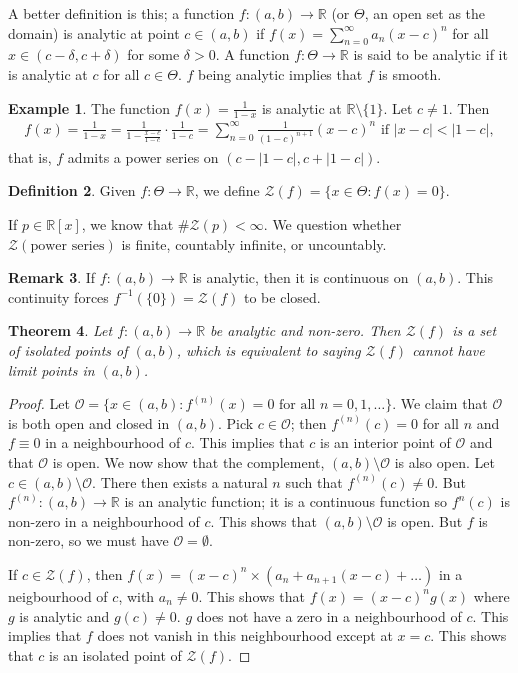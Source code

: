 \documentclass[15pt,a4paper]{book}
\newtheorem{theorem}{Theorem}[chapter]
\theoremstyle{definition}
\newtheorem{definition}[theorem]{Definition}
\newtheorem{example}[theorem]{Example}
\newtheorem{remark}[theorem]{Remark}
\newcommand{\abs}[1]{\left| #1 \right|} %
\newcommand{\R}{\mathbb{R}} %
\newcommand{\cZ}{\mathcal{Z}}
\newcommand{\cO}{\mathcal{O}}
\begin{document}
A better definition is this; a function $f:(a,b) \to \R$ (or $\Theta$, an open set as the domain) is analytic at point $c \in (a,b)$ if $f(x) = \sum_{n=0}^{\infty} a_{n}(x-c)^{n}$ for all $x \in (c-\delta,c+\delta)$ for some $\delta > 0$. A function $f:\Theta \to \R$ is said to be analytic if it is analytic at $c$ for all $c \in \Theta$. $f$ being analytic implies that $f$ is smooth.

\begin{example}
    The function $f(x) = \frac{1}{1-x}$ is analytic at $\R \setminus \{1\}$. Let $c \neq 1$. Then
    \begin{align}
        f(x) = \frac{1}{1-x} = \frac{1}{1-\frac{x-c}{1-c}} \cdot \frac{1}{1-c} = \sum_{n=0}^{\infty} \frac{1}{(1-c)^{n+1}}(x-c)^{n} \text{ if } \abs{x-c} < \abs{1-c},
    \end{align}
    that is, $f$ admits a power series on $(c-\abs{1-c},c+\abs{1-c})$.
\end{example}

\begin{definition}
    Given $f:\Theta \to \R$, we define $\cZ(f) = \{x \in \Theta : f(x) = 0\}$.
\end{definition}
If $p \in \R[x]$, we know that $\# \cZ(p) < \infty$. We question whether $\cZ(\text{power series})$ is finite, countably infinite, or uncountably.
\begin{remark}
    If $f:(a,b) \to \R$ is analytic, then it is continuous on $(a,b)$. This continuity forces $f^{-1}(\{0\}) = \cZ(f)$ to be closed.
\end{remark}

\begin{theorem}
    Let $f:(a,b) \to \R$ be analytic and non-zero. Then $\cZ(f)$ is a set of isolated points of $(a,b)$, which is equivalent to saying $\cZ(f)$ cannot have limit points in $(a,b)$.
\end{theorem}
\begin{proof}
    Let $\cO = \{x \in (a,b) : f^{(n)}(x) = 0 \text{ for all } n = 0,1,\ldots\}$. We claim that $\cO$ is both open and closed in $(a,b)$. Pick $c \in \cO$; then $f^{(n)}(c) = 0$ for all $n$ and $f \equiv 0$ in a neighbourhood of $c$. This implies that $c$ is an interior point of $\cO$ and that $\cO$ is open. We now show that the complement, $(a,b)\setminus\cO$ is also open. Let $c \in (a,b)\setminus\cO$. There then exists a natural $n$ such that $f^{(n)}(c) \neq 0$. But $f^{(n)}:(a,b) \to \R$ is an analytic function; it is a continuous function so $f^{n}(c)$ is non-zero in a neighbourhood of $c$. This shows that $(a,b)\setminus \cO$ is open. But $f$ is non-zero, so we must have $\cO = \emptyset$.
    
    If $c \in \cZ(f)$, then $f(x) = (x-c)^{n} \times (a_{n}+a_{n+1}(x-c) + \ldots)$ in a neigbourhood of $c$, with $a_{n} \neq 0$. This shows that $f(x) = (x-c)^{n}g(x)$ where $g$ is analytic and $g(c) \neq 0$. $g$ does not have a zero in a neighbourhood of $c$. This implies that $f$ does not vanish in this neighbourhood except at $x = c$. This shows that $c$ is an isolated point of $\cZ(f)$.
\end{proof}
\end{document}
